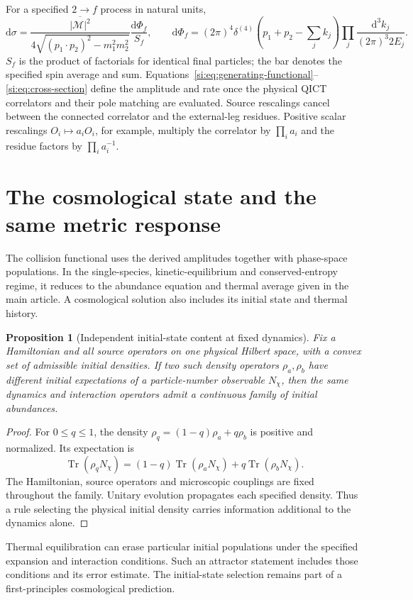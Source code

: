 \documentclass[11pt,a4paper]{article}
\newtheorem{proposition}{Proposition}\renewcommand{\theproposition}{S\arabic{proposition}}
\newcommand{\dd}{\mathrm{d}}\DeclareMathOperator{\Tr}{Tr}
\begin{document}
For a specified $2\to f$ process in natural units,
\begin{equation}\label{si:eq:cross-section}
\dd\sigma=\frac{\overline{|\mathcal M|^2}}{4\sqrt{(p_1\cdot p_2)^2-m_1^2m_2^2}}
\frac{\dd\Phi_f}{S_f},\qquad
\dd\Phi_f=(2\pi)^4\delta^{(4)}\!\left(p_1+p_2-\sum_jk_j\right)
\prod_j\frac{\dd^3k_j}{(2\pi)^3 2E_j}.
\end{equation}
$S_f$ is the product of factorials for identical final particles; the bar denotes the specified spin average and sum. Equations~\eqref{si:eq:generating-functional}--\eqref{si:eq:cross-section} define the amplitude and rate once the physical QICT correlators and their pole matching are evaluated. Source rescalings cancel between the connected correlator and the external-leg residues. Positive scalar rescalings $O_i\mapsto a_iO_i$, for example, multiply the correlator by $\prod_i a_i$ and the residue factors by $\prod_i a_i^{-1}$.

\section{The cosmological state and the same metric response}
\label{si:cosmology}
The collision functional uses the derived amplitudes together with phase-space populations. In the single-species, kinetic-equilibrium and conserved-entropy regime, it reduces to the abundance equation and thermal average given in the main article. A cosmological solution also includes its initial state and thermal history.

\begin{proposition}[Independent initial-state content at fixed dynamics]\label{si:prop:state}
Fix a Hamiltonian and all source operators on one physical Hilbert space, with a convex set of admissible initial densities. If two such density operators $\rho_a,\rho_b$ have different initial expectations of a particle-number observable $N_\chi$, then the same dynamics and interaction operators admit a continuous family of initial abundances.
\end{proposition}
\begin{proof}
For $0\leq q\leq1$, the density $\rho_q=(1-q)\rho_a+q\rho_b$ is positive and normalized. Its expectation is
\[
\Tr(\rho_qN_\chi)=(1-q)\Tr(\rho_aN_\chi)+q\Tr(\rho_bN_\chi).
\]
The Hamiltonian, source operators and microscopic couplings are fixed throughout the family. Unitary evolution propagates each specified density. Thus a rule selecting the physical initial density carries information additional to the dynamics alone.
\end{proof}
Thermal equilibration can erase particular initial populations under the specified expansion and interaction conditions. Such an attractor statement includes those conditions and its error estimate. The initial-state selection remains part of a first-principles cosmological prediction.
\end{document}
